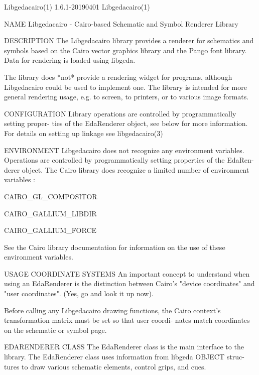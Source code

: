 Libgedacairo(1)                 1.6.1-20190401                 Libgedacairo(1)



NAME
       Libgedacairo - Cairo-based Schematic and Symbol Renderer Library

DESCRIPTION
       The Libgedacairo library provides a renderer for schematics and symbols
       based on the Cairo vector graphics library and the Pango font  library.
       Data for rendering is loaded using libgeda.

       The  library  does  *not*  provide  a  rendering  widget  for programs,
       although Libgedacairo could be used to implement one.  The  library  is
       intended for more general rendering usage, e.g. to screen, to printers,
       or to various image formats.

CONFIGURATION
       Library operations are controlled by programmatically  setting  proper-
       ties  of  the  EdaRenderer  object, see below for more information. For
       details on setting up linkage see libgedacairo(3)

ENVIRONMENT
       Libgedacairo does not recognize any environment  variables.  Operations
       are  controlled  by  programmatically setting properties of the EdaRen-
       derer object. The Cairo library does  recognize  a  limited  number  of
       environment variables :

          CAIRO_GL_COMPOSITOR

          CAIRO_GALLIUM_LIBDIR

          CAIRO_GALLIUM_FORCE

       See the Cairo library documentation for information on the use of these
       environment variables.

USAGE
          COORDINATE SYSTEMS
              An important concept to understand when using an EdaRenderer  is
              the  distinction  between Cairo's "device coordinates" and "user
              coordinates". (Yes, go and look it up now).

              Before calling any Libgedacairo  drawing  functions,  the  Cairo
              context's transformation matrix must be set so that user coordi-
              nates match coordinates on the schematic or symbol page.

          EDARENDERER CLASS
              The EdaRenderer class is the main interface to the library.  The
              EdaRenderer  class  uses  information from libgeda OBJECT struc-
              tures to draw various schematic  elements,  control  grips,  and
              cues.

